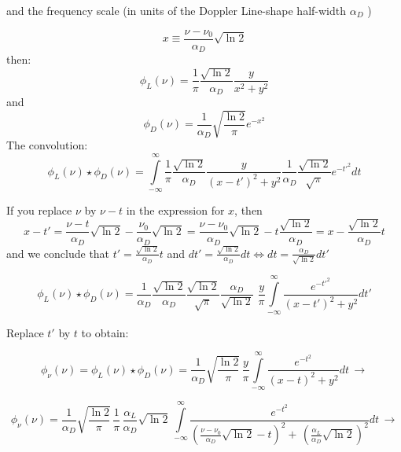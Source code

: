 \documentclass[10pt,a4paper]{report}
\begin{document}
\begin{flushleft}
and the frequency scale (in units of the Doppler Line-shape half-width  $\alpha_D$ )
 
\begin{equation}
 \label{eq:x}
 x \equiv \frac{\nu-\nu_0}{\alpha_D} \sqrt{\ln{2}} 
\end{equation}
then:
\[ \phi_L(\nu) = \frac{1}{\pi} \frac{\sqrt{\ln{2}}}{\alpha_D} \frac{y}{x^2+y^2} \]
and
\[ \phi_D(\nu) = \frac{1}{\alpha_D} \sqrt{\frac{\ln{2}}{\pi}} e^{-x^2} \]
The convolution:
\[ \phi_L(\nu)\star\phi_D(\nu)=\int\limits_{-\infty}^\infty {\frac{1}{\pi} \frac{\sqrt{\ln{2}}}{\alpha_D} \frac{y}{(x-t')^2 + y^2} \frac{1}{\alpha_D} \frac{\sqrt{\ln{2}}}{\sqrt{\pi}} e^{-t'^2} dt}\]

If you replace $\nu$ by $\nu-t$  in the expression for $x$, then 
\[ x-t'=\frac{\nu-t}{\alpha_D}\sqrt{\ln{2}}-\frac{\nu_0}{\alpha_D}\sqrt{\ln{2}}=
\frac{\nu-\nu_0}{\alpha_D}\sqrt{\ln{2}}-t\frac{\sqrt{\ln{2}}}{\alpha_D}=
x-\frac{\sqrt{\ln{2}}}{\alpha_D}t \]
and we conclude that $ t'=\frac{\sqrt{\ln{2}}}{\alpha_D}t $ and
$ dt'=\frac{\sqrt{\ln{2}}}{\alpha_D}dt 
\Leftrightarrow dt=\frac{\alpha_D}{\sqrt{\ln{2}}}dt' $

\[ \phi_L(\nu)\star\phi_D(\nu)=\frac{1}{\alpha_D}\frac{\sqrt{\ln{2}}}{\alpha_D}
\frac{\sqrt{\ln{2}}}{\sqrt{\pi}}\frac{\alpha_D}{\sqrt{\ln{2}}}\, \,
\frac{y}{\pi}\int\limits_{-\infty}^\infty {\frac{e^{-t'^2}}{(x-t')^2+y^2}dt'} \]

Replace $t'$ by $t$ to obtain:

\begin{equation} 
\phi_\nu(\nu)=\phi_L(\nu)\star\phi_D(\nu)=
\frac{1}{\alpha_D}\sqrt{\frac{\ln{2}}{\pi}}\, \frac{y}{\pi}\int\limits_{-\infty}^\infty {\frac{e^{-t^2}}{(x-t)^2+y^2}dt}\,
\rightarrow
\label{Voigtprofile}
\end{equation} 


\begin{equation}
\phi_\nu(\nu)=
\frac{1}{\alpha_D}\sqrt{\frac{\ln{2}}{\pi}}\,
\frac{1}{\pi}\,
\frac{\alpha_L}{\alpha_D} \sqrt{\ln{2}}\,
\int\limits_{-\infty}^\infty {\frac{e^{-t^2}}{\left(\frac{\nu-\nu_0}{\alpha_D} \sqrt{\ln{2}}-t\right)^2+\,
\left({\frac{\alpha_L}{\alpha_D} \sqrt{\ln{2}}}\right)^2}dt}\,
\rightarrow
\label{Voigtprofile_ex1}
\end{equation} 

\end{flushleft}
\end{document}
